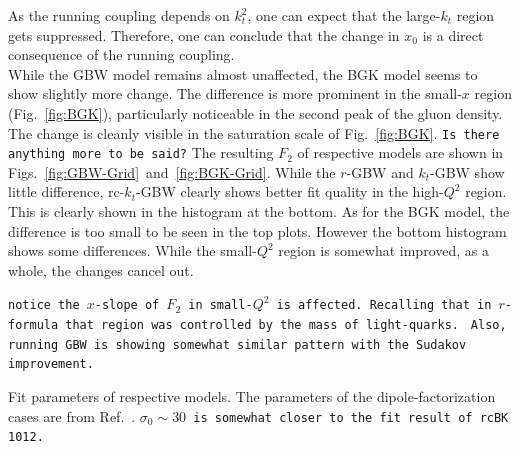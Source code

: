 \documentclass[12pt]{article}
\numberwithin{equation}{section}
\numberwithin{table}{section}
\numberwithin{figure}{section}
\newcommand{\comment}[1]{\texttt{\color{red}#1}}
\begin{document}
As the running coupling depends on $k_t^2$,  one can expect that the large-$k_t$ region gets suppressed.  Therefore, one can conclude that the change in $x_0$ is a direct consequence of the running coupling.\\
While the GBW model remains almost unaffected, the BGK model seems to show slightly more change. The difference is more prominent in the small-$x$ region (Fig.~\ref{fig:BGK}), particularly noticeable in the second peak of the gluon density.
The change is cleanly visible in the saturation scale of Fig.~\ref{fig:BGK}. \comment{Is there anything more to be said?}
The resulting $F_2$ of respective models are shown in Figs.~\ref{fig:GBW-Grid}~and~\ref{fig:BGK-Grid}.
While the $r$-GBW and $k_t$-GBW show little difference, rc-$k_t$-GBW clearly shows better fit quality in the high-$Q^2$ region. This is clearly shown in the histogram at the bottom. 
As for the BGK model, the difference is too small to be seen in the top plots. However the bottom histogram shows some differences. While the small-$Q^2$ region is somewhat improved, as a whole, the changes cancel out. 

\comment{notice the $x$-slope of $F_2$ in small-$Q^2$ is affected. Recalling that in $r$-formula that region was controlled by the mass of light-quarks. }
\comment{Also, running GBW is showing somewhat similar pattern with the Sudakov improvement.}

\begin{table}[t]
\begin{subtable}{\textwidth}
\center\footnotesize

\vspace{2mm}
\end{subtable}
\begin{subtable}{\textwidth}
\center\footnotesize

\vspace{2mm}
\end{subtable}
\caption{Fit parameters of respective models. The parameters of the dipole-factorization cases are from Ref.~\cite{Goda:2022wsc}.
\comment{$\sigma_0\sim30$ is somewhat closer to the fit result of rcBK 1012.}
}
\label{tab:table}
\end{table}
\end{document}
